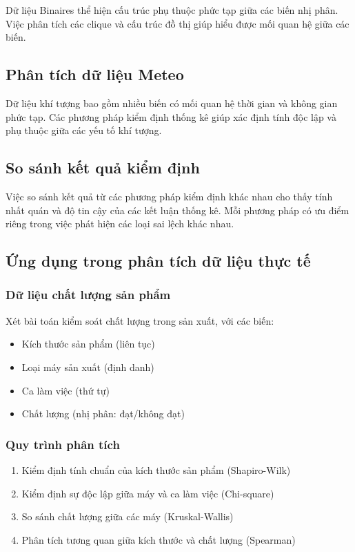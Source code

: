 Dữ liệu Binaires thể hiện cấu trúc phụ thuộc phức tạp giữa các biến nhị phân. Việc phân tích các clique và cấu trúc đồ thị giúp hiểu được mối quan hệ giữa các biến.

\subsection{Phân tích dữ liệu Meteo}

Dữ liệu khí tượng bao gồm nhiều biến có mối quan hệ thời gian và không gian phức tạp. Các phương pháp kiểm định thống kê giúp xác định tính độc lập và phụ thuộc giữa các yếu tố khí tượng.

\subsection{So sánh kết quả kiểm định}

Việc so sánh kết quả từ các phương pháp kiểm định khác nhau cho thấy tính nhất quán và độ tin cậy của các kết luận thống kê. Mỗi phương pháp có ưu điểm riêng trong việc phát hiện các loại sai lệch khác nhau.

\subsection{Ứng dụng trong phân tích dữ liệu thực tế}
\subsubsection*{Dữ liệu chất lượng sản phẩm}
Xét bài toán kiểm soát chất lượng trong sản xuất, với các biến:
\begin{itemize}
    \item Kích thước sản phẩm (liên tục)
    \item Loại máy sản xuất (định danh)
    \item Ca làm việc (thứ tự)
    \item Chất lượng (nhị phân: đạt/không đạt)
\end{itemize}



\subsubsection*{Quy trình phân tích}
\begin{enumerate}
    \item Kiểm định tính chuẩn của kích thước sản phẩm (Shapiro-Wilk)
    \item Kiểm định sự độc lập giữa máy và ca làm việc (Chi-square)
    \item So sánh chất lượng giữa các máy (Kruskal-Wallis)
    \item Phân tích tương quan giữa kích thước và chất lượng (Spearman)
\end{enumerate}

